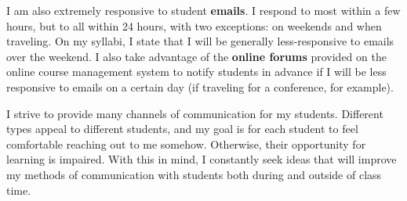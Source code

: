 \documentclass[12pt]{amsart} \usepackage{amssymb}
\begin{document}
I am also extremely responsive to student \textbf{emails}. I respond to most within a few hours, but to all within 24 hours, with two exceptions: on weekends and when traveling. On my syllabi, I state that I will be generally less-responsive to emails over the weekend. I also take advantage of the \textbf{online forums} provided on the online course management system to notify students in advance if I will be less responsive to emails on a certain day (if traveling for a conference, for example).

\vspace{1cm}
I strive to provide many channels of communication for my students. Different types appeal to   different students, and my goal is for each student to feel comfortable reaching out to me somehow. Otherwise, their opportunity for learning is impaired. With this in mind, I  constantly seek ideas that will improve my methods of communication with students both during and outside of class time.
\end{document}
